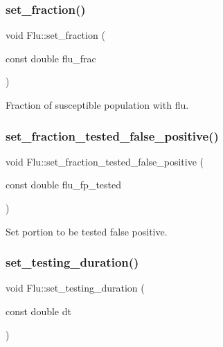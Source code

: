 \subsubsection{\texorpdfstring{set\+\_\+fraction()}{set\_fraction()}}
{\footnotesize\ttfamily void Flu\+::set\+\_\+fraction (\begin{DoxyParamCaption}\item[{const double}]{flu\+\_\+frac }\end{DoxyParamCaption})\hspace{0.3cm}{\ttfamily [inline]}}



Fraction of susceptible population with flu. 

\mbox{\label{classFlu_ad2f9eaba0cde52dc931fd37fe8158165}} 
\subsubsection{\texorpdfstring{set\+\_\+fraction\+\_\+tested\+\_\+false\+\_\+positive()}{set\_fraction\_tested\_false\_positive()}}
{\footnotesize\ttfamily void Flu\+::set\+\_\+fraction\+\_\+tested\+\_\+false\+\_\+positive (\begin{DoxyParamCaption}\item[{const double}]{flu\+\_\+fp\+\_\+tested }\end{DoxyParamCaption})\hspace{0.3cm}{\ttfamily [inline]}}



Set portion to be tested false positive. 

\mbox{\label{classFlu_af84acec1b3a8cfee13cba841bd6b6914}} 
\subsubsection{\texorpdfstring{set\+\_\+testing\+\_\+duration()}{set\_testing\_duration()}}
{\footnotesize\ttfamily void Flu\+::set\+\_\+testing\+\_\+duration (\begin{DoxyParamCaption}\item[{const double}]{dt }\end{DoxyParamCaption})\hspace{0.3cm}{\ttfamily [inline]}}



